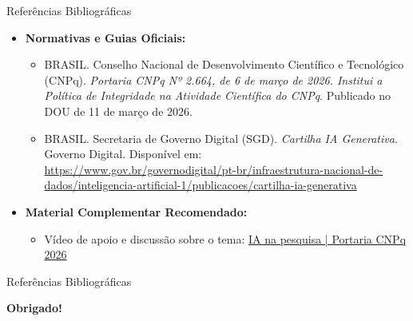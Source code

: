 \documentclass[aspectratio=169]{beamer}
\begin{document}
\begin{frame}{Referências Bibliográficas}
    \footnotesize 
    \begin{itemize}
        \item \textbf{Normativas e Guias Oficiais:}
        \begin{itemize}
            \item BRASIL. Conselho Nacional de Desenvolvimento Científico e Tecnológico (CNPq). \textit{Portaria CNPq Nº 2.664, de 6 de março de 2026. Institui a Política de Integridade na Atividade Científica do CNPq}. Publicado no DOU de 11 de março de 2026.
            
            \vspace{0.2cm}
            
            \item BRASIL. Secretaria de Governo Digital (SGD). \textit{Cartilha IA Generativa}. Governo Digital. Disponível em: \\ \url{https://www.gov.br/governodigital/pt-br/infraestrutura-nacional-de-dados/inteligencia-artificial-1/publicacoes/cartilha-ia-generativa}
        \end{itemize}
        
        \vspace{0.4cm}
        
        \item \textbf{Material Complementar Recomendado:}
        \begin{itemize}
            \item Vídeo de apoio e discussão sobre o tema: \href{https://www.youtube.com/watch?v=6yiHXPxoI6Q}{IA na pesquisa | Portaria CNPq 2026}
        \end{itemize}
    \end{itemize}
\end{frame}

\begin{frame}{Referências Bibliográficas}

    \vspace{0.6cm}
    \begin{center}
        \textbf{Obrigado!}
    \end{center}
\end{frame}
\end{document}
